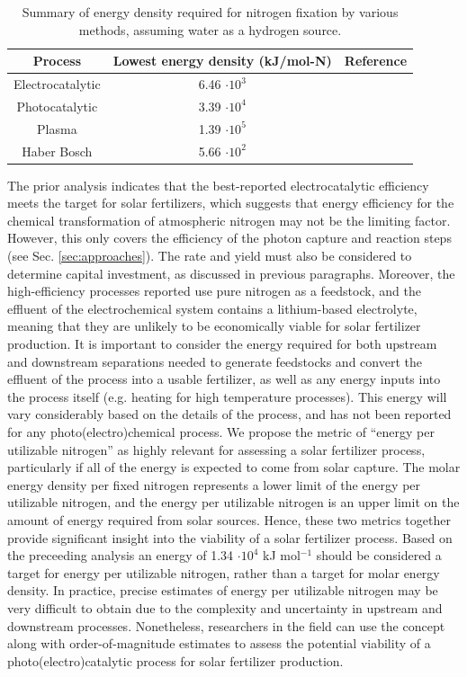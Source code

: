 \begin{table}
\centering
\begin{tabular}{ |c c c| }
\hline
 Process & Lowest energy density (kJ/mol-N) & Reference \\  \hline
 Electrocatalytic & 6.46 $\cdot 10^3$ & \cite{Song_2018} \\ \hline
 Photocatalytic & 3.39 $\cdot 10^4$ & \cite{Shiraishi_2018} \\ \hline
 Plasma & 1.39  $\cdot 10^5$  & \cite{Hawtof_2019} \\ \hline
 Haber Bosch & 5.66 $\cdot 10^2$ & \cite{Grundt_1982} \\ \hline
\end{tabular}
\caption{Summary of energy density required for nitrogen fixation by various methods, assuming water as a hydrogen source. }
\label{tab:energy_density}
\end{table}


The prior analysis indicates that the best-reported electrocatalytic efficiency meets the target for solar fertilizers, which suggests that energy efficiency for the chemical transformation of atmospheric nitrogen may not be the limiting factor. However, this only covers the efficiency of the photon capture and reaction steps (see Sec. \ref{sec:approaches}). The rate and yield must also be considered to determine capital investment, as discussed in previous paragraphs. Moreover, the high-efficiency processes reported use pure nitrogen as a feedstock, and the effluent of the electrochemical system contains a lithium-based electrolyte, meaning that they are unlikely to be economically viable for solar fertilizer production. It is important to consider the energy required for both upstream and downstream separations needed to generate feedstocks and convert the effluent of the process into a usable fertilizer, as well as any energy inputs into the process itself (e.g. heating for high temperature processes). This energy will vary considerably based on the details of the process, and has not been reported for any photo(electro)chemical process. We propose the metric of ``energy per utilizable nitrogen'' as highly relevant for assessing a solar fertilizer process, particularly if all of the energy is expected to come from solar capture. The molar energy density per fixed nitrogen represents a lower limit of the energy per utilizable nitrogen, and the energy per utilizable nitrogen is an upper limit on the amount of energy required from solar sources. Hence, these two metrics together provide significant insight into the viability of a solar fertilizer process. Based on the preceeding analysis an energy of 1.34 $\cdot 10^4$ kJ mol$^{-1}$ should be considered a target for energy per utilizable nitrogen, rather than a target for molar energy density. In practice, precise estimates of energy per utilizable nitrogen may be very difficult to obtain due to the complexity and uncertainty in upstream and downstream processes. Nonetheless, researchers in the field can use the concept along with order-of-magnitude estimates to assess the potential viability of a photo(electro)catalytic process for solar fertilizer production.

